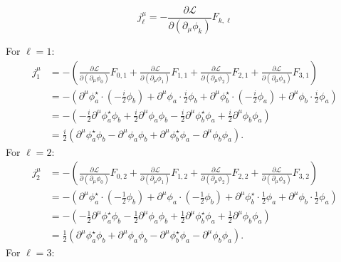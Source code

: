 \[ j^\mu_\ell = -\frac{\partial \mathcal L}{\partial ( \partial_\mu \phi_k)} F_{k,\ell} \]



For \(\ell = 1\):
   \[
   \begin{aligned}
   j^\mu_1 &= -\left( \frac{\partial \mathcal{L}}{\partial (\partial_\mu \phi_0)} F_{0,1} + \frac{\partial \mathcal{L}}{\partial (\partial_\mu \phi_1)} F_{1,1} + \frac{\partial \mathcal{L}}{\partial (\partial_\mu \phi_2)} F_{2,1} + \frac{\partial \mathcal{L}}{\partial (\partial_\mu \phi_3)} F_{3,1} \right) \\
   &= -\left( \partial^\mu \phi_a^\star \cdot \left( -\frac{i}{2} \phi_b \right) + \partial^\mu \phi_a \cdot \frac{i}{2} \phi_b + \partial^\mu \phi_b^\star \cdot \left( -\frac{i}{2} \phi_a \right) + \partial^\mu \phi_b \cdot \frac{i}{2} \phi_a \right) \\
   &= -\left( -\frac{i}{2} \partial^\mu \phi_a^\star \phi_b + \frac{i}{2} \partial^\mu \phi_a \phi_b - \frac{i}{2} \partial^\mu \phi_b^\star \phi_a + \frac{i}{2} \partial^\mu \phi_b \phi_a \right) \\
   &= \frac{i}{2} \left( \partial^\mu \phi_a^\star \phi_b - \partial^\mu \phi_a \phi_b + \partial^\mu \phi_b^\star \phi_a - \partial^\mu \phi_b \phi_a \right).
   \end{aligned}
   \]
For \(\ell = 2\):
   \[
   \begin{aligned}
   j^\mu_2 &= -\left( \frac{\partial \mathcal{L}}{\partial (\partial_\mu \phi_0)} F_{0,2} + \frac{\partial \mathcal{L}}{\partial (\partial_\mu \phi_1)} F_{1,2} + \frac{\partial \mathcal{L}}{\partial (\partial_\mu \phi_2)} F_{2,2} + \frac{\partial \mathcal{L}}{\partial (\partial_\mu \phi_3)} F_{3,2} \right) \\
   &= -\left( \partial^\mu \phi_a^\star \cdot \left( -\frac{1}{2} \phi_b \right) + \partial^\mu \phi_a \cdot \left( -\frac{1}{2} \phi_b \right) + \partial^\mu \phi_b^\star \cdot \frac{1}{2} \phi_a + \partial^\mu \phi_b \cdot \frac{1}{2} \phi_a \right) \\
   &= -\left( -\frac{1}{2} \partial^\mu \phi_a^\star \phi_b - \frac{1}{2} \partial^\mu \phi_a \phi_b + \frac{1}{2} \partial^\mu \phi_b^\star \phi_a + \frac{1}{2} \partial^\mu \phi_b \phi_a \right) \\
   &= \frac{1}{2} \left( \partial^\mu \phi_a^\star \phi_b + \partial^\mu \phi_a \phi_b - \partial^\mu \phi_b^\star \phi_a - \partial^\mu \phi_b \phi_a \right).
   \end{aligned}
   \]
For \(\ell = 3\):
